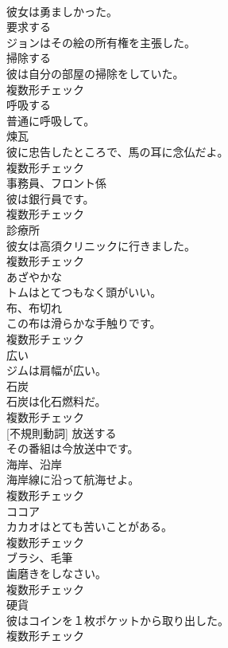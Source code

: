 \documentclass[8pt]{extreport}
\begin{document}
\begin{CJK}{UTF8}{min}
\\	彼女は勇ましかった。	
\\	[動詞]	要求する	
\\	ジョンはその絵の所有権を主張した。	
\\	[名詞]	掃除する	
\\	彼は自分の部屋の掃除をしていた。	
\\	複数形チェック
\\	[動詞]	呼吸する	
\\	普通に呼吸して。	
\\	[名詞]	煉瓦	
\\	彼に忠告したところで、馬の耳に念仏だよ。	
\\	複数形チェック
\\	[名詞]	事務員、フロント係	
\\	彼は銀行員です。	
\\	複数形チェック
\\	[名詞]	診療所	
\\	彼女は高須クリニックに行きました。	
\\	複数形チェック
\\	[形容詞]	あざやかな	
\\	トムはとてつもなく頭がいい。	
\\	[名詞]	布、布切れ	
\\	この布は滑らかな手触りです。	
\\	複数形チェック
\\	[形容詞]	広い	
\\	ジムは肩幅が広い。	
\\	[名詞]	石炭	
\\	石炭は化石燃料だ。	
\\	複数形チェック
\\	[動詞] [不規則動詞]	放送する	
\\	その番組は今放送中です。	
\\	[名詞]	海岸、沿岸	
\\	海岸線に沿って航海せよ。	
\\	複数形チェック
\\	[名詞]	ココア	
\\	カカオはとても苦いことがある。	
\\	複数形チェック
\\	[名詞]	ブラシ、毛筆	
\\	歯磨きをしなさい。	
\\	複数形チェック
\\	[名詞]	硬貨	
\\	彼はコインを１枚ポケットから取り出した。	
\\	複数形チェック

\end{CJK}
\end{document}
